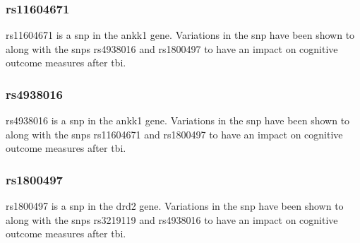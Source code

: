 \documentclass[11pt]{article}
\begin{document}
\subsubsection{rs11604671}
rs11604671 is a \gls{snp} in the \gls{ankk1} gene\cite{Rs11604671SNPedia}. Variations in the \gls{snp} have been shown to along with the \glspl{snp} rs4938016 and rs1800497 to have an impact on cognitive outcome measures after \gls{tbi}.\cite{mcallisterSingleNucleotidePolymorphisms2008}

\subsubsection{rs4938016}
rs4938016 is a \gls{snp} in the \gls{ankk1} gene\cite{mcallisterSingleNucleotidePolymorphisms2008}. Variations in the \gls{snp} have been shown to along with the \glspl{snp} rs11604671 and rs1800497 to have an impact on cognitive outcome measures after \gls{tbi}.\cite{mcallisterSingleNucleotidePolymorphisms2008}

\subsubsection{rs1800497}
rs1800497 is a \gls{snp} in the \gls{drd2} gene\cite{Rs1800497SNPedia}. Variations in the \gls{snp} have been shown to along with the \glspl{snp} rs3219119 and rs4938016 to have an impact on cognitive outcome measures after \gls{tbi}.\cite{mcallisterSingleNucleotidePolymorphisms2008}
\end{document}
